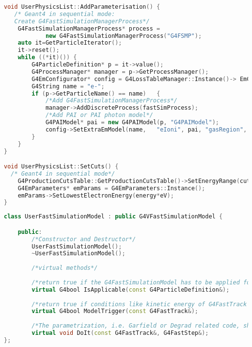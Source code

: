 \documentclass[preprint,12pt,sort&compress]{elsarticle}
\begin{document}
\begin{lstlisting}[label=code_AddParameterisation,
language=C++,directivestyle={\color{black}}
emph={int,char,double,float,unsigned},
emphstyle={\color{blue}},caption={Instantiation of the G4FastSimulationManagerProcess in a physics list in sequential Geant4. The code shows how to enable the PAI model and the Geant4/Garfield++ interface. From Geant4 10.2 on, the PAI model may be enabled via UI command instead, however this code will still work.}]
void UserPhysicsList::AddParameterisation() {
   /* Geant4 in sequential mode: 
   Create G4FastSimulationManagerProcess*/
	G4FastSimulationManagerProcess* process = 
			new G4FastSimulationManagerProcess("G4FSMP");
	auto it=GetParticleIterator();
	it->reset();
	while ((*it)()) {
		G4ParticleDefinition* p = it->value();
		G4ProcessManager* manager = p->GetProcessManager();
		G4EmConfigurator* config = G4LossTableManager::Instance()->	EmConfigurator();
		G4String name = "e-";
		if (p->GetParticleName() == name) 	{
			/*Add G4FastSimulationManagerProcess*/
			manager->AddDiscreteProcess(fastSimProcess);
			/*Add PAI or PAI photon model*/
			G4PAIModel* pai = new G4PAIModel(p, "G4PAIModel");
			config->SetExtraEmModel(name, 	"eIoni", pai, "gasRegion", 0.*eV, 1.*TeV, pai);
		}
	}
}

void UserPhysicsList::SetCuts() {
  /* Geant4 in sequential mode*/
	G4ProductionCutsTable::GetProductionCutsTable()->SetEnergyRange(cut*eV, 1.*TeV);
	G4EmParameters* emParams = G4EmParameters::Instance();
	emParams->SetLowestElectronEnergy(energy*eV);
}
\end{lstlisting}

\newpage

\begin{lstlisting}[label=code_G4FastSimulationModel_class,language=C++,caption=Class definition of the user-defined class derived from the G4VFastSimulationModel. ]
class UserFastSimulationModel : public G4VFastSimulationModel {

	public:
	    /*Constructor and Destructor*/
	    UserFastSimulationModel();
	    ~UserFastSimulationModel();
	    
	    /*virtual methods*/
	    
	    /*return true if the G4FastSimulationModel has to be applied for a particle type*/
	    virtual G4bool IsApplicable(const G4ParticleDefinition&);
	    
	    /*return true if conditions like kinetic energy of G4FastTrack are fulfilled*/
	    virtual G4bool ModelTrigger(const G4FastTrack&);
	    
	    /*The parametrization, i.e. Garfield or Degrad related code, should be implemented here*/
	    virtual void DoIt(const G4FastTrack&, G4FastStep&);
};
\end{lstlisting}
\end{document}

